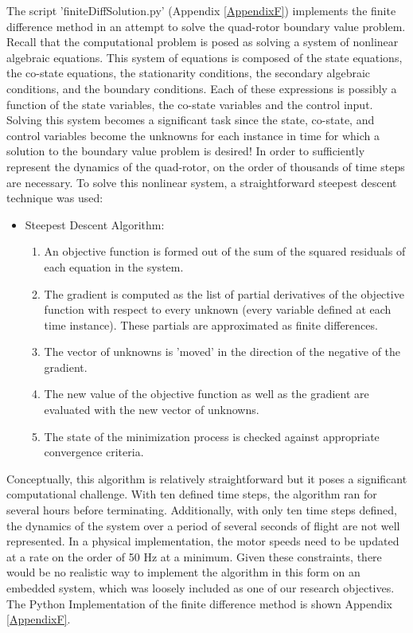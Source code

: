 The script 'finiteDiffSolution.py' (Appendix \ref{AppendixF}) implements the finite difference method in an attempt to solve the quad-rotor boundary value problem. Recall that the computational problem is posed as solving a system of nonlinear algebraic equations. This system of equations is composed of the state equations, the co-state equations, the stationarity conditions, the secondary algebraic conditions, and the boundary conditions. Each of these expressions is possibly a function of the state variables, the co-state variables and the control input. Solving this system becomes a significant task since the state, co-state, and control variables become the unknowns for each instance in time for which a solution to the boundary value problem is desired! In order to sufficiently represent the dynamics of the quad-rotor, on the order of thousands of time steps are necessary. To solve this nonlinear system, a straightforward steepest descent technique was used:


\begin{itemize}
\item Steepest Descent Algorithm:
\begin{enumerate}
    \item{An objective function is formed out of the sum of the squared residuals of each equation in the system.}
    \item{The gradient is computed as the list of partial derivatives of the objective function with respect to every unknown (every variable defined at each time instance). These partials are approximated as finite differences.}
    \item{The vector of unknowns is 'moved' in the direction of the negative of the gradient.}
    \item{The new value of the objective function as well as the gradient are evaluated with the new vector of unknowns. }
    \item{The state of the minimization process is checked against appropriate convergence criteria.}
\end{enumerate}
\end{itemize}


Conceptually, this algorithm is relatively straightforward but it poses a significant computational challenge. With ten defined time steps, the algorithm ran for several hours before terminating. Additionally, with only ten time steps defined, the dynamics of the system over a period of several seconds of flight are not well represented. In a physical implementation, the motor speeds need to be updated at a rate on the order of 50 Hz at a minimum. Given  these constraints, there would be no realistic way to implement the algorithm in this form on an embedded system, which was loosely included as one of our research objectives. The Python Implementation of the finite difference method is shown Appendix \ref{AppendixF}.


